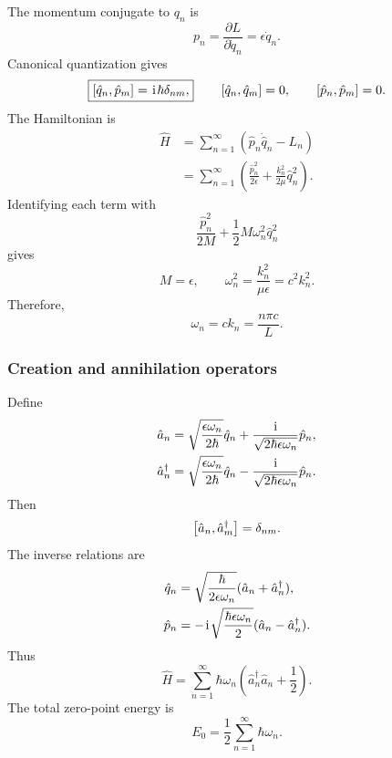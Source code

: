 The momentum conjugate to $q_n$ is
\begin{equation}
 p_n=\frac{\partial L}{\partial\dot q_n}=\epsilon\dot q_n.
\end{equation}
Canonical quantization gives
\begin{equation}
 \boxed{\left[\hat q_n,\hat p_m\right]=\hspace{1pt}\mathrm{i}\hspace{1pt}\hbar\delta_{nm},}
 \qquad
 \left[\hat q_n,\hat q_m\right]=0,
 \qquad
 \left[\hat p_n,\hat p_m\right]=0.
\end{equation}
The Hamiltonian is
\begin{align}
 \hat H
 &=\sum_{n=1}^{\infty}
 \left(\hat p_n\dot{\hat q}_n-L_n\right)\\
 &=\boxed{\sum_{n=1}^{\infty}
 \left(\frac{\hat p_n^2}{2\epsilon}
 +\frac{k_n^2}{2\mu}\hat q_n^2\right)}.
\end{align}
Identifying each term with
\begin{equation}
 \frac{\hat p_n^2}{2M}+\frac12M\omega_n^2\hat q_n^2
\end{equation}
gives
\begin{equation}
 M=\epsilon,
 \qquad
 \omega_n^2=\frac{k_n^2}{\mu\epsilon}=c^2k_n^2.
\end{equation}
Therefore,
\begin{equation}
 \boxed{\omega_n=ck_n=\frac{n\pi c}{L}.}
\end{equation}

\subsubsection{Creation and annihilation operators}
Define
\begin{align}
 \hat a_n
 &=\sqrt{\frac{\epsilon\omega_n}{2\hbar}}\hat q_n
 +\frac{\hspace{1pt}\mathrm{i}\hspace{1pt}}{\sqrt{2\hbar\epsilon\omega_n}}\hat p_n,\\
 \hat a_n^\dagger
 &=\sqrt{\frac{\epsilon\omega_n}{2\hbar}}\hat q_n
 -\frac{\hspace{1pt}\mathrm{i}\hspace{1pt}}{\sqrt{2\hbar\epsilon\omega_n}}\hat p_n.
\end{align}
Then
\begin{equation}
 \left[\hat a_n,\hat a_m^\dagger\right]=\delta_{nm}.
\end{equation}
The inverse relations are
\begin{align}
 \hat q_n&=\sqrt{\frac{\hbar}{2\epsilon\omega_n}}
 (\hat a_n+\hat a_n^\dagger),\\
 \hat p_n&=-\hspace{1pt}\mathrm{i}\hspace{1pt}\sqrt{\frac{\hbar\epsilon\omega_n}{2}}
 (\hat a_n-\hat a_n^\dagger).
\end{align}
Thus
\begin{equation}
 \boxed{\hat H=\sum_{n=1}^{\infty}
 \hbar\omega_n\left(\hat a_n^\dagger\hat a_n+\frac12\right).}
\end{equation}
The total zero-point energy is
\begin{equation}
 E_{0}=\frac12\sum_{n=1}^{\infty}\hbar\omega_n.
\end{equation}


